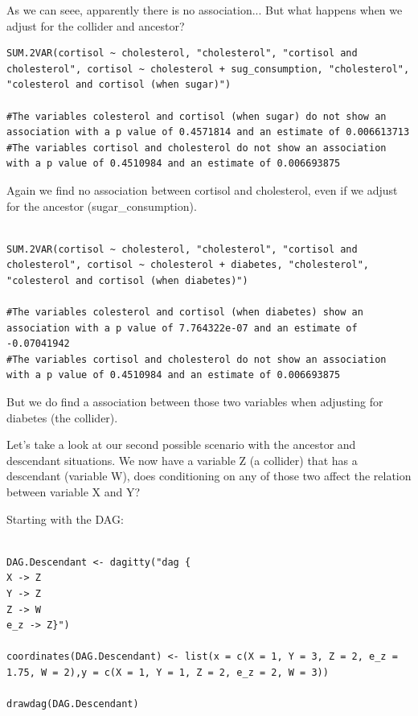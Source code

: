 \documentclass{article}
\begin{document}
As we can seee, apparently there is no association... But what happens when we adjust for the collider and ancestor?\par

\begin{lstlisting}
SUM.2VAR(cortisol ~ cholesterol, "cholesterol", "cortisol and cholesterol", cortisol ~ cholesterol + sug_consumption, "cholesterol", "colesterol and cortisol (when sugar)")

#The variables colesterol and cortisol (when sugar) do not show an association with a p value of 0.4571814 and an estimate of 0.006613713 
#The variables cortisol and cholesterol do not show an association with a p value of 0.4510984 and an estimate of 0.006693875 

\end{lstlisting}

Again we find no association between cortisol and cholesterol, even if we adjust for the ancestor (sugar\_consumption).\par

\begin{lstlisting}

SUM.2VAR(cortisol ~ cholesterol, "cholesterol", "cortisol and cholesterol", cortisol ~ cholesterol + diabetes, "cholesterol", "colesterol and cortisol (when diabetes)")

#The variables colesterol and cortisol (when diabetes) show an association with a p value of 7.764322e-07 and an estimate of -0.07041942 
#The variables cortisol and cholesterol do not show an association with a p value of 0.4510984 and an estimate of 0.006693875 

\end{lstlisting}

But we do find a association between those two variables when adjusting for diabetes (the collider).\par
Let's take a look at our second possible scenario with the ancestor and descendant situations. We now have a variable Z (a collider) that has a descendant (variable W), does conditioning on any of those two affect the relation between variable X and Y?\par
Starting with the DAG:

\begin{lstlisting}

DAG.Descendant <- dagitty("dag {
X -> Z
Y -> Z
Z -> W
e_z -> Z}")

coordinates(DAG.Descendant) <- list(x = c(X = 1, Y = 3, Z = 2, e_z = 1.75, W = 2),y = c(X = 1, Y = 1, Z = 2, e_z = 2, W = 3))

drawdag(DAG.Descendant)

\end{lstlisting}
\end{document}
